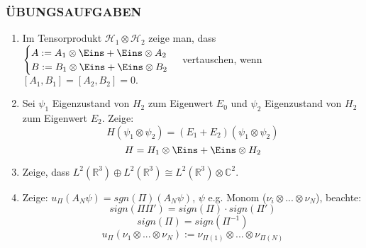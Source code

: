 \documentclass[twoside,a4paper]{scrartcl}
\renewcommand{\1}{\mathds{1}}
\begin{document}
\subsubsection*{ÜBUNGSAUFGABEN}
\begin{enumerate}
 \item Im Tensorprodukt $\mathcal H_1 \otimes \mathcal H_2$ zeige man, dass $\begin{cases}
  A:= A_1\otimes \Eins+ \Eins \otimes A_2\\
  B:= B_1\otimes \Eins+ \Eins \otimes B_2\\
\end{cases}$ vertauschen, wenn $[A_1,B_1]=[A_2,B_2]=0.$
 \item Sei $\psi_1$ Eigenzustand von $H_2$ zum Eigenwert $E_0$ und $\psi_2$ Eigenzustand von $H_2$ zum Eigenwert $E_2$.
Zeige: $$H(\psi_1 \otimes \psi_2)=(E_1+E_2)(\psi_1 \otimes \psi_2)$$
$$H=H_1\otimes \Eins+ \Eins \otimes H_2$$
 \item Zeige, dass $L^2(\mathbb R^3)\oplus L^2(\mathbb R^3)\cong L^2(\mathbb R^3)\otimes \mathbb C^2$.
 \item Zeige: $u_\Pi(A_N \psi)=sgn(\Pi)(A_N \psi)$, $\psi$ e.g. Monom ($\nu_i \otimes ... \otimes \nu_N$), beachte:
$$sign(\Pi \Pi')=sign(\Pi)\cdot sign(\Pi')$$
$$sign(\Pi )=sign(\Pi^{-1})$$
$$u_\Pi(\nu_1 \otimes ... \otimes \nu_N):=\nu_{\Pi(1)}\otimes ... \otimes \nu_{\Pi(N)}$$
\end{enumerate}
\end{document}
